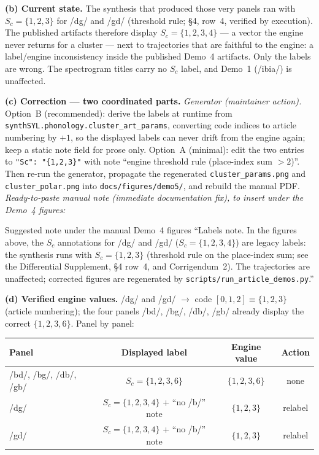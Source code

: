 \documentclass[11pt,letterpaper]{article}
\newcommand{\code}[1]{\texttt{#1}}
\begin{document}
\textbf{(b) Current state.} The synthesis that produced those very panels ran
with $S_c = \{1,2,3\}$ for /dg/ and /gd/ (threshold rule; \S4, row~4, verified
by execution). The published artifacts therefore display $S_c = \{1,2,3,4\}$
--- a vector the engine never returns for a cluster --- next to trajectories
that are faithful to the engine: a label/engine inconsistency inside the
published Demo~4 artifacts. Only the labels are wrong. The spectrogram titles
carry no $S_c$ label, and Demo~1 (/ibia/) is unaffected.

\textbf{(c) Correction --- two coordinated parts.}
\emph{Generator (maintainer action).} Option~B (recommended): derive the
labels at runtime from \code{synthSYL.phonology.cluster\_art\_params},
converting code indices to article numbering by $+1$, so the displayed labels
can never drift from the engine again; keep a static note field for prose
only. Option~A (minimal): edit the two entries to \code{"Sc": "\{1,2,3\}"} with
note ``engine threshold rule (place-index sum $> 2$)''. Then re-run the
generator, propagate the regenerated \code{cluster\_params.png} and
\code{cluster\_polar.png} into \code{docs/figures/demo5/}, and rebuild the
manual PDF. \emph{Ready-to-paste manual note (immediate documentation fix),
to insert under the Demo~4 figures:}
\begin{pastebox}{Suggested note under the manual Demo~4 figures}
\small
``Labels note. In the figures above, the $S_c$ annotations for /dg/ and /gd/
($S_c = \{1,2,3,4\}$) are legacy labels: the synthesis runs with
$S_c = \{1,2,3\}$ (threshold rule on the place-index sum; see the Differential
Supplement, \S4 row~4, and Corrigendum~2). The trajectories are unaffected;
corrected figures are regenerated by \code{scripts/run\_article\_demos.py}.''
\end{pastebox}

\textbf{(d) Verified engine values.} /dg/ and /gd/ $\to$ code $[0,1,2]
\equiv \{1,2,3\}$ (article numbering); the four panels /bd/, /bg/, /db/,
/gb/ already display the correct $\{1,2,3,6\}$. Panel by panel:

\begin{center}
\footnotesize
\begin{tabular}{@{}lccc@{}}
\toprule
\textbf{Panel} & \textbf{Displayed label} & \textbf{Engine value} &
\textbf{Action} \\
\midrule
/bd/, /bg/, /db/, /gb/ & $S_c = \{1,2,3,6\}$ & $\{1,2,3,6\}$ & none \\
/dg/ & $S_c = \{1,2,3,4\}$ + ``no /b/'' note & $\{1,2,3\}$ & relabel \\
/gd/ & $S_c = \{1,2,3,4\}$ + ``no /b/'' note & $\{1,2,3\}$ & relabel \\
\bottomrule
\end{tabular}
\end{center}
\end{document}
